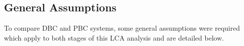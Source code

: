 \documentclass[conference]{IEEEtran}
\begin{document}

\subsection{General Assumptions}\label{Generalassume}
To compare DBC and PBC systems, some general assumptions were required which apply to both stages of this LCA analysis and are detailed below.
\end{document}
